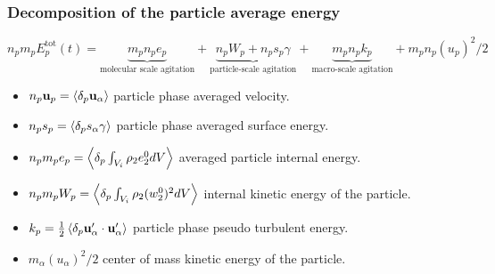\documentclass{sintefbeamer}
\begin{document}
\begin{frame}
  \frametitle{Decomposition of the particle average energy}
  \begin{equation*}
    n_p m_p E_p^\text{tot}(t) 
    = 
    \underbrace{m_p n_p e_p }_\text{molecular scale agitation}
    + \underbrace{n_p W_p
    + n_p s_p \gamma}_\text{particle-scale agitation}
    + \underbrace{m_p n_p k_p}_\text{macro-scale agitation}
    + m_p n_p (u_p)^2/2
    \label{eq:E_p_def}
\end{equation*}
  

\begin{itemize}
  \item $n_p\textbf{u}_p = \left<\delta_p \textbf{u}_\alpha\right>$  particle phase averaged velocity. 
  \item $n_ps_p = \left<\delta_p s_\alpha \gamma\right>$  particle phase averaged surface energy. 
  \item $n_p m_p e_p =  \left<\delta_p \int_{V_{i}}  \rho_2 e_2^0  dV\right>$  averaged particle internal energy. 
  \item $n_p m_p W_p = \left<\delta_p \int_{V_{i}}  \rho_2 (w_2^0)^2  dV\right>$  internal kinetic energy of the particle. 
  \item $k_p = \frac{1}{2}\left<\delta_p \textbf{u}_\alpha'\cdot \textbf{u}_\alpha'\right>$  particle phase pseudo turbulent energy. 
  \item $ m_\alpha (u_\alpha)^2/2$  center of mass kinetic energy of the particle. 
\end{itemize}
\end{frame}
\end{document}
